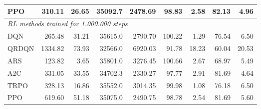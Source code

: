 \begin{samepage}
\begin{center}
\begin{tabular}{l|rr|rr|rr|rr}
    PPO          &   310.11 &    26.65 &    35092.7 &    2478.69 &   98.83 &    2.58 &   82.13 &    4.96 \\
    \midrule
    \multicolumn{9}{l}{\textit{RL methods trained for 1.000.000 steps}} \\
    \midrule
    DQN          &   265.48 &    31.21 &    35615.0 &    2790.70 &  100.22 &    1.29 &   76.54 &    6.50 \\
    QRDQN        &  1334.82 &    73.93 &    32566.0 &    6920.03 &   91.78 &   18.23 &   60.04 &   20.53 \\
    ARS          &   123.82 &     3.65 &    35801.0 &    3276.45 &  100.66 &    2.67 &   68.97 &    5.49 \\
    A2C          &   331.05 &    33.55 &    34702.3 &    2330.27 &   97.77 &    2.91 &   81.69 &    4.64 \\
    TRPO         &   328.13 &    16.86 &    35552.0 &    3014.35 &   99.98 &    1.08 &   76.18 &    6.50 \\
    PPO          &   619.60 &    51.18 &    35075.0 &    2490.75 &   98.78 &    2.54 &   81.69 &    5.60 \\
    \bottomrule
  \end{tabular}
\end{center}
\end{samepage}

